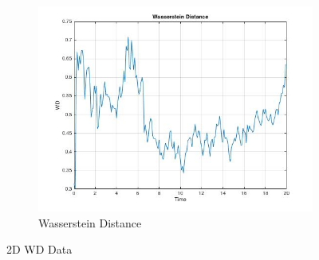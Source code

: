 \documentclass[10pt, margins = .5in]{article}
\begin{document}
\begin{figure}[H]
\begin{subfigure}{.45\linewidth}
\includegraphics[scale = .45]{WD.jpg}
  \caption{Wasserstein Distance}
\label{fig: WD}
\end{subfigure}
\caption{2D WD Data}
\label{fig:test}
\end{figure}

 
\end{document}
